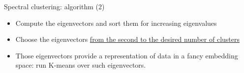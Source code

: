 \begin{frame}{Spectral clustering: algorithm (2)}
\begin{itemize}
\item Compute the eigenvectors and sort them for increasing eigenvalues
\item Choose the eigenvectors \underline{from the second to the desired number of clusters}
\item Those eigenvectors provide a representation of data in a fancy embedding space: run K-means over such eigenvectors.
\end{itemize}
\end{frame}
